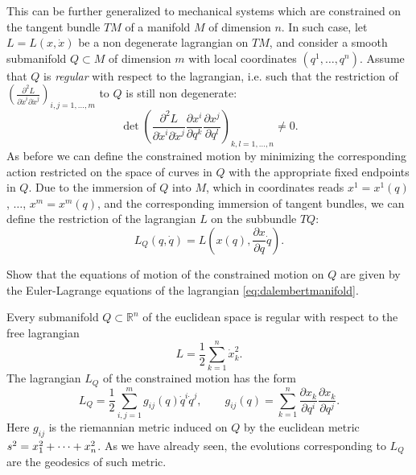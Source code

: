 \documentclass[english,fontsize=11pt,paper=a5,oneside]{scrbook}
\newcommand{\R}{\mathbb{R}}
\let\d\relax
\DeclareMathOperator{\d}{d}
\theoremstyle{definition}
\newenvironment{example}
  {\pushQED{\qed}\renewcommand{\qedsymbol}{$\lozenge$}\examplex}
  {\popQED\endexamplex}
\newenvironment{exercise}
  {\pushQED{\qed}\renewcommand{\qedsymbol}{$\maltese$}\exercisex}
  {\popQED\endexercisex}
\begin{document}
This can be further generalized to mechanical systems which are constrained on the tangent bundle $TM$ of a manifold $M$ of dimension $n$.
In such case, let  $L=L(x,\dot x)$ be a non degenerate lagrangian on $TM$, and consider a smooth submanifold $Q\subset M$ of dimension $m$ with local coordinates $(q^1,\ldots,q^n)$.
Assume that $Q$ is \emph{regular} with respect to the lagrangian, i.e. such that the restriction of $\left(\frac{\partial^2 L}{\partial \dot x^i \partial\dot x^j}\right)_{i,j=1,\ldots,m}$ to $Q$ is still non degenerate:
\begin{equation}
    \det\left(\frac{\partial^2 L}{\partial \dot x^i \partial\dot x^j}\frac{\partial x^i}{\partial q^k}\frac{\partial x^j}{\partial q^l}\right)_{k,l=1,\ldots,n} \neq 0.
\end{equation}
As before we can define the constrained motion by minimizing the corresponding action restricted on the space of curves in $Q$ with the appropriate fixed endpoints in $Q$. Due to the immersion of $Q$ into $M$, which in coordinates reads $x^1 = x^1(q)$, $\ldots$, $x^m=x^m(q)$, and the corresponding immersion of tangent bundles, we can define the restriction of the lagrangian $L$ on the subbundle $TQ$:
\begin{equation}\label{eq:dalembertmanifold}
    L_Q(q,\dot q) = L\left(x(q), \frac{\partial x}{\partial q}\dot q\right).
\end{equation}

\begin{exercise}
    Show that the equations of motion of the constrained motion on $Q$ are given by the Euler-Lagrange equations of the lagrangian \eqref{eq:dalembertmanifold}.
\end{exercise}

\begin{example}
    Every submanifold $Q\subset \R^n$ of the euclidean space is regular with respect to the free lagrangian
    \begin{equation}
        L = \frac12 \sum_{k=1}^n \dot x^2_k.
    \end{equation}
    The lagrangian $L_Q$ of the constrained motion has the form
    \begin{equation}
        L_Q = \frac12 \sum_{i,j=1}^m g_{ij}(q)\dot q^i\dot q^j, \qquad g_{ij}(q) = \sum_{k=1}^n \frac{\partial x_k}{\partial q^i}\frac{\partial x_k}{\partial q^j}.
    \end{equation}
    Here $g_{ij}$ is the riemannian metric induced on $Q$ by the euclidean metric $\d s^2 = \d x_1^2 + \cdots + \d x_n^2$.
    As we have already seen, the evolutions corresponding to $L_Q$ are the geodesics of such metric.
\end{example}
\end{document}
